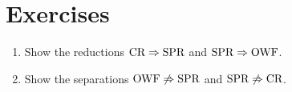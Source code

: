 
\section*{Exercises}

\begin{enumerate}[label=\textbf{Exercise \thesection.\arabic*}, wide=0pt]
  \item Show the reductions $\textnormal{CR}\Rightarrow\textnormal{SPR}$ and $\textnormal{SPR}\Rightarrow\textnormal{OWF}$.
  \item Show the separations $\textnormal{OWF}\not\Rightarrow\textnormal{SPR}$ and $\textnormal{SPR}\not\Rightarrow\textnormal{CR}$.
\end{enumerate}
